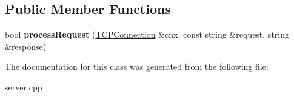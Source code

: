\subsection*{Public Member Functions}
\begin{DoxyCompactItemize}
\item 
\mbox{\label{class_my_base_a818864f09718a0aa6d65f5ac5733b689}} 
bool {\bfseries process\+Request} (\mbox{\hyperlink{classcppu_1_1_t_c_p_connection}{T\+C\+P\+Connection}} \&cnx, const string \&request, string \&response)
\end{DoxyCompactItemize}


The documentation for this class was generated from the following file\+:\begin{DoxyCompactItemize}
\item 
server.\+cpp\end{DoxyCompactItemize}
